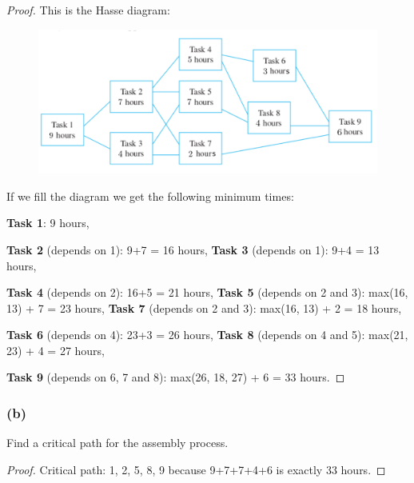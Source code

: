 \documentclass[14pt]{extarticle}
\begin{document}
\begin{proof}
        This is the Hasse diagram:

        \begin{figure}[ht!]
                \centering
                \includegraphics[scale=0.4]{../images/8.5.51.png}
        \end{figure}

        If we fill the diagram we get the following minimum times:

        {\bf Task 1}: 9 hours,

        {\bf Task 2} (depends on 1): 9+7 = 16 hours, {\bf Task 3} (depends on 1): 9+4 = 13 hours,

        {\bf Task 4} (depends on 2): 16+5 = 21 hours, {\bf Task 5} (depends on 2 and 3): max(16, 13) + 7 = 23 hours,
        {\bf Task 7} (depends on 2 and 3): max(16, 13) + 2 = 18 hours,

        {\bf Task 6} (depends on 4): 23+3 = 26 hours, {\bf Task 8} (depends on 4 and 5): max(21, 23) + 4 = 27 hours,

        {\bf Task 9} (depends on 6, 7 and 8): max(26, 18, 27) + 6 = 33 hours.
\end{proof}

\subsubsection{(b)}
Find a critical path for the assembly process.

\begin{proof}
        Critical path: 1, 2, 5, 8, 9 because 9+7+7+4+6 is exactly 33 hours.
\end{proof}
\end{document}
